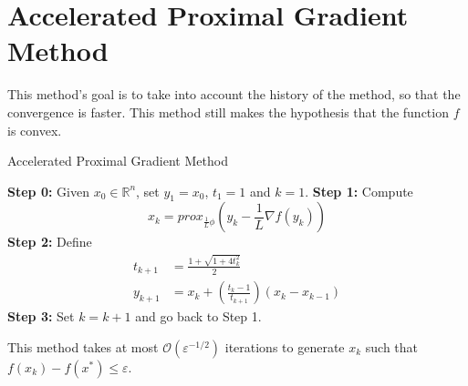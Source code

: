 \documentclass[12pt, openany]{report}
\theoremstyle{definition}
\begin{document}
\section{Accelerated Proximal Gradient Method}
This method's goal is to take into account the history of the method, so that the convergence is faster. This method still makes the hypothesis that the function \(f\) is convex.
\begin{algorithm}[H]
    \caption{Accelerated Proximal Gradient Method}\label{algo:Acc_prox}
    \begin{algorithmic}[1]
    \State \textbf{Step 0:} Given $x_0 \in \mathbb{R}^n$, set \(y_1=x_0\), \(t_1=1\) and $k=1$.
    \State \textbf{Step 1:} Compute 
    \begin{equation}
        x_k = prox_{\frac{1}{L}\phi}\left(y_k-\frac{1}{L}\nabla f(y_k)\right)
    \end{equation}
    \State \textbf{Step 2:} Define 
    \begin{align}
        t_{k+1} &= \frac{1+\sqrt{1+4t_k^2}}{2}\\
        y_{k+1} &= x_k + \left(\frac{t_k-1}{t_{k+1}}\right)(x_k-x_{k-1})      
    \end{align}
    \State \textbf{Step 3:} Set \(k=k+1\) and go back to Step 1.
    \end{algorithmic}
\end{algorithm}
This method takes at most \(\mathcal{O}(\varepsilon^{-1/2})\) iterations to generate \(x_k\) such that \(f(x_k)-f(x^*)\le \varepsilon\).
\end{document}
